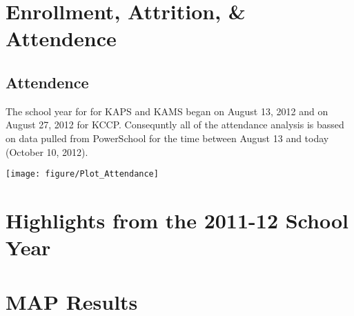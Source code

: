 \documentclass[sfsidenotes, justified]{tufte-handout}\usepackage{graphicx, color}
\newenvironment{knitrout}{}{} %
\begin{document}
\section{Enrollment, Attrition, \& Attendence}
\subsection{Attendence} 
The school year for for KAPS and KAMS began on August 13, 2012 and on August 27, 2012 for KCCP.  Consequntly all of the attendance analysis is bassed on data pulled from PowerSchool for the time between August 13 and today (October 10, 2012).  







\begin{figure*}
\begin{knitrout}
\color{fgcolor}

{\centering \texttt{[image: figure/Plot\_Attendance]} 

}


\end{knitrout}

\end{figure*}




\section{Highlights from the 2011-12 School Year}
\blindtext
\blindtext
\section{MAP Results}
\blindtext
\blindtext
\end{document}
